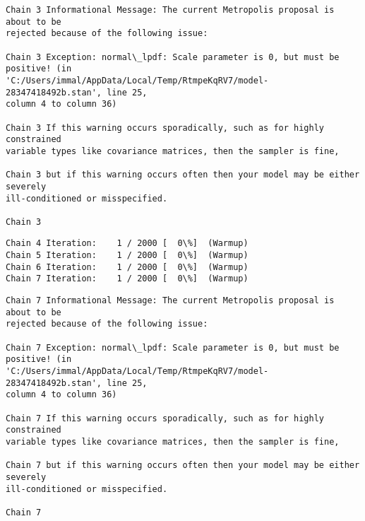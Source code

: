 \documentclass[11pt]{article}
\begin{document}
    \begin{Verbatim}[commandchars=\\\{\}]
Chain 3 Informational Message: The current Metropolis proposal is about to be
rejected because of the following issue:

Chain 3 Exception: normal\_lpdf: Scale parameter is 0, but must be positive! (in
'C:/Users/immal/AppData/Local/Temp/RtmpeKqRV7/model-28347418492b.stan', line 25,
column 4 to column 36)

Chain 3 If this warning occurs sporadically, such as for highly constrained
variable types like covariance matrices, then the sampler is fine,

Chain 3 but if this warning occurs often then your model may be either severely
ill-conditioned or misspecified.

Chain 3

    \end{Verbatim}

    \begin{Verbatim}[commandchars=\\\{\}]
Chain 4 Iteration:    1 / 2000 [  0\%]  (Warmup)
Chain 5 Iteration:    1 / 2000 [  0\%]  (Warmup)
Chain 6 Iteration:    1 / 2000 [  0\%]  (Warmup)
Chain 7 Iteration:    1 / 2000 [  0\%]  (Warmup)
    \end{Verbatim}

    \begin{Verbatim}[commandchars=\\\{\}]
Chain 7 Informational Message: The current Metropolis proposal is about to be
rejected because of the following issue:

Chain 7 Exception: normal\_lpdf: Scale parameter is 0, but must be positive! (in
'C:/Users/immal/AppData/Local/Temp/RtmpeKqRV7/model-28347418492b.stan', line 25,
column 4 to column 36)

Chain 7 If this warning occurs sporadically, such as for highly constrained
variable types like covariance matrices, then the sampler is fine,

Chain 7 but if this warning occurs often then your model may be either severely
ill-conditioned or misspecified.

Chain 7

    \end{Verbatim}
\end{document}
